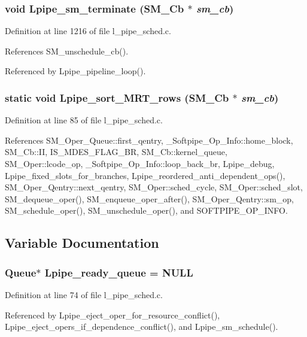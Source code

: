 \subsubsection{\setlength{\rightskip}{0pt plus 5cm}void Lpipe\_\-sm\_\-terminate (\bf{SM\_\-Cb} $\ast$ {\em sm\_\-cb})}\label{l__pipe__sched_8c_dee91af7d1d223f216f3c892e3ec9c0f}




Definition at line 1216 of file l\_\-pipe\_\-sched.c.

References SM\_\-unschedule\_\-cb().

Referenced by Lpipe\_\-pipeline\_\-loop().
\subsubsection{\setlength{\rightskip}{0pt plus 5cm}static void Lpipe\_\-sort\_\-MRT\_\-rows (\bf{SM\_\-Cb} $\ast$ {\em sm\_\-cb})\hspace{0.3cm}{\tt  [static]}}\label{l__pipe__sched_8c_8959fddf750d749cd097c00736be43c6}




Definition at line 85 of file l\_\-pipe\_\-sched.c.

References SM\_\-Oper\_\-Queue::first\_\-qentry, \_\-Softpipe\_\-Op\_\-Info::home\_\-block, SM\_\-Cb::II, IS\_\-MDES\_\-FLAG\_\-BR, SM\_\-Cb::kernel\_\-queue, SM\_\-Oper::lcode\_\-op, \_\-Softpipe\_\-Op\_\-Info::loop\_\-back\_\-br, Lpipe\_\-debug, Lpipe\_\-fixed\_\-slots\_\-for\_\-branches, Lpipe\_\-reordered\_\-anti\_\-dependent\_\-ops(), SM\_\-Oper\_\-Qentry::next\_\-qentry, SM\_\-Oper::sched\_\-cycle, SM\_\-Oper::sched\_\-slot, SM\_\-dequeue\_\-oper(), SM\_\-enqueue\_\-oper\_\-after(), SM\_\-Oper\_\-Qentry::sm\_\-op, SM\_\-schedule\_\-oper(), SM\_\-unschedule\_\-oper(), and SOFTPIPE\_\-OP\_\-INFO.

\subsection{Variable Documentation}
\subsubsection{\setlength{\rightskip}{0pt plus 5cm}\bf{Queue}$\ast$ \bf{Lpipe\_\-ready\_\-queue} = NULL\hspace{0.3cm}{\tt  [static]}}\label{l__pipe__sched_8c_d3571bda1f4af9f3c27d5c33ba538a2c}




Definition at line 74 of file l\_\-pipe\_\-sched.c.

Referenced by Lpipe\_\-eject\_\-oper\_\-for\_\-resource\_\-conflict(), Lpipe\_\-eject\_\-opers\_\-if\_\-dependence\_\-conflict(), and Lpipe\_\-sm\_\-schedule().